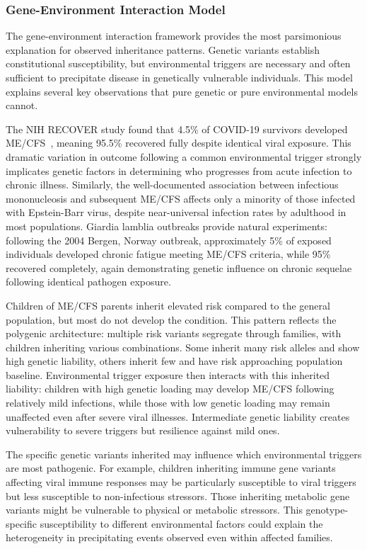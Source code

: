 \subsubsection{Gene-Environment Interaction Model}

The gene-environment interaction framework provides the most parsimonious explanation for observed inheritance patterns. Genetic variants establish constitutional susceptibility, but environmental triggers are necessary and often sufficient to precipitate disease in genetically vulnerable individuals. This model explains several key observations that pure genetic or pure environmental models cannot.

The NIH RECOVER study found that 4.5\% of COVID-19 survivors developed ME/CFS~\cite{Komaroff2023}, meaning 95.5\% recovered fully despite identical viral exposure. This dramatic variation in outcome following a common environmental trigger strongly implicates genetic factors in determining who progresses from acute infection to chronic illness. Similarly, the well-documented association between infectious mononucleosis and subsequent ME/CFS affects only a minority of those infected with Epstein-Barr virus, despite near-universal infection rates by adulthood in most populations. Giardia lamblia outbreaks provide natural experiments: following the 2004 Bergen, Norway outbreak, approximately 5\% of exposed individuals developed chronic fatigue meeting ME/CFS criteria, while 95\% recovered completely, again demonstrating genetic influence on chronic sequelae following identical pathogen exposure.

Children of ME/CFS parents inherit elevated risk compared to the general population, but most do not develop the condition. This pattern reflects the polygenic architecture: multiple risk variants segregate through families, with children inheriting various combinations. Some inherit many risk alleles and show high genetic liability, others inherit few and have risk approaching population baseline. Environmental trigger exposure then interacts with this inherited liability: children with high genetic loading may develop ME/CFS following relatively mild infections, while those with low genetic loading may remain unaffected even after severe viral illnesses. Intermediate genetic liability creates vulnerability to severe triggers but resilience against mild ones.

The specific genetic variants inherited may influence which environmental triggers are most pathogenic. For example, children inheriting immune gene variants affecting viral immune responses may be particularly susceptible to viral triggers but less susceptible to non-infectious stressors. Those inheriting metabolic gene variants might be vulnerable to physical or metabolic stressors. This genotype-specific susceptibility to different environmental factors could explain the heterogeneity in precipitating events observed even within affected families.

